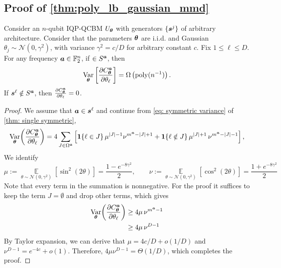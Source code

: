 \documentclass[10pt, twocolumn, a4paper]{article}
\theoremstyle{plain}
\theoremstyle{definition}
\theoremstyle{remark}
\begin{document}
\subsection{Proof of \cref{thm:poly_lb_gaussian_mmd}}
Consider an $n$-qubit IQP-QCBM $U_{\bm{\theta}}$ with generators $\{{\bm{s}^j}\}$ of arbitrary architecture. Consider that the parameters ${\bm{\theta}}$ are i.i.d. and Gaussian $\theta_j \sim\mathcal{N}(0,\gamma^2)$, with variance $\gamma^2 = c/D$ for arbitrary constant $c$. Fix $1\leq \ell \leq D$. For any frequency ${\bm{a}} \in \mathbb{F}_2^n$, if $\in S^{\bm{a}}$, then 
\begin{equation}
\operatorname*{Var}_{{\bm{\theta}}} \left[ \frac{\partial C^{\bm{a}}_{\bm{\theta}}}{\partial \theta_\ell} \right] = \Omega\left(\mathrm{poly}(n^{-1})\right).
\end{equation} 
If ${\bm{s}^\ell} \notin S^{\bm{a}}$, then $\frac{\partial C^{\bm{a}}_{\bm{\theta}}}{\partial \theta_\ell}=0$.
\begin{proof}
We assume that ${\bm{a}} \in {\bm{s}^\ell}$ and continue from \cref{eq: symmetric variance} of \cref{thm: single symmetric},
\begin{equation}
\operatorname*{Var}_{{\bm{\theta}}}\!\left(\frac{\partial C_{\bm{\theta}}^{\bm{a}}}{\partial\theta_\ell}\right)
=
4\sum_{J\in \Omega^{\bm{a}}}
\left[
\bm{1}\{\ell\in J\}\,\mu^{|J|-1}\nu^{m^{\bm{a}}-|J|+1}
+
\bm{1}\{\ell\notin J\}\,\mu^{|J|+1}\,\nu^{m^{\bm{a}}-|J|-1}
\right],
\label{eq:single_var_exact_c}
\end{equation}
We identify \begin{equation}
    \mu:=\operatorname*{\mathbb{E}}_{\theta\sim\mathcal N(0,\gamma^2)}[\sin^2(2\theta)]
=\frac{1-e^{-8\gamma^2}}{2},
\qquad
\nu:=\operatorname*{\mathbb{E}}_{\theta\sim\mathcal N(0,\gamma^2)}[\cos^2(2\theta)]
=\frac{1+e^{-8\gamma^2}}{2}
\end{equation} 
Note that every term in the summation is nonnegative. For the proof it suffices to keep the term $J= \emptyset$ and drop other terms, which gives
\begin{align}
\operatorname*{Var}_{{\bm{\theta}}}\!\left(\frac{\partial C_{\bm{\theta}}^{\bm{a}}}{\partial\theta_\ell}\right) & \geq 
4\mu\,\nu^{m^{\bm{a}}-1} \\
& \geq  4\mu\,\nu^{D-1} 
\label{eq:single_var_lb_c}
\end{align}
By Taylor expansion, we can derive that $\mu = 4c/D + o(1/D)$ and $\nu^{D-1} = e^{-4c} + o(1)$. Therefore, $4\mu \nu^{D-1} =\Theta(1/D)$, which completes the proof.
\end{proof}

\newpage 
\end{document}
